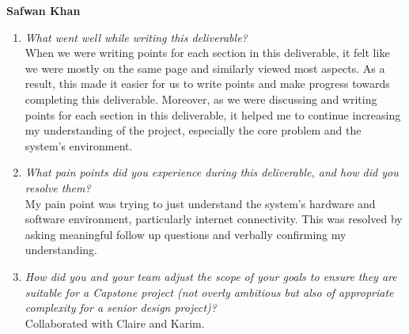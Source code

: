 \documentclass{article}
\begin{document}
\textbf{Safwan Khan}
\begin{enumerate}
    \item \textit{What went well while writing this deliverable?}\\
     When we were writing points for each section in this deliverable, it felt like we were mostly on the same page and similarly viewed most aspects. As a result, this made it easier for us to write points and make progress towards completing this deliverable. Moreover, as we were discussing and writing points for each section
     in this deliverable, it helped me to continue increasing my understanding of the project, especially the core problem and the system's environment.
     
    \item \textit{What pain points did you experience during this deliverable, and how
    did you resolve them?}\\
    My pain point was trying to just understand the system's hardware and software environment, particularly 
    internet connectivity. This was resolved by asking meaningful follow up questions and verbally confirming my understanding.

    \item \textit{How did you and your team adjust the scope of your goals to ensure
    they are suitable for a Capstone project (not overly ambitious but also of
    appropriate complexity for a senior design project)?}\\
    Collaborated with Claire and Karim. 
\end{enumerate}  
\end{document}
